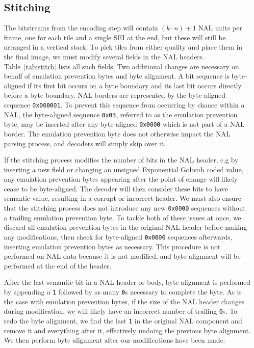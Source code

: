 \subsection{Stitching}

The bitstreams from the encoding step will contain $(k \cdot n)+1$ NAL units per frame, one for each tile and a single SEI at the end, but these will still be arranged in a vertical stack. To pick tiles from either quality and place them in the final image, we must modify several fields in the NAL headers. Table~\ref{tab:stitch} lists all such fields. Two additional changes are necessary on behalf of emulation prevention bytes and byte alignment. A bit sequence is byte-aligned if its first bit occurs on a byte boundary and its last bit occurs directly before a byte boundary. NAL borders are represented by the byte-aligned sequence \texttt{0x000001}. To prevent this sequence from occurring by chance within a NAL, the byte-aligned sequence \texttt{0x03}, referred to as the emulation prevention byte, may be inserted after any byte-aligned \texttt{0x0000} which is not part of a NAL border. The emulation prevention byte does not otherwise impact the NAL parsing process, and decoders will simply skip over it.

If the stitching process modifies the number of bits in the NAL header, e.g by inserting a new field or changing an unsigned Exponential Golomb coded value, any emulation prevention bytes appearing after the point of change will likely cease to be byte-aligned. The decoder will then consider these bits to have semantic value, resulting in a corrupt or incorrect header. We must also ensure that the stitching process does not introduce any new \texttt{0x0000} sequences without a trailing emulation prevention byte. To tackle both of these issues at once, we discard all emulation prevention bytes in the original NAL header before making any modifications, then check for byte-aligned \texttt{0x0000} sequences afterwards, inserting emulation prevention bytes as necessary. This procedure is not performed on NAL data because it is not modified, and byte alignment will be performed at the end of the header.

After the last semantic bit in a NAL header or body, byte alignment is performed by appending a \texttt{1} followed by as many \texttt{0}s necessary to complete the byte. As is the case with emulation prevention bytes, if the size of the NAL header changes during modification, we will likely have an incorrect number of trailing \texttt{0}s. To redo the byte alignment, we find the last \texttt{1} in the original NAL component and remove it and everything after it, effectively undoing the previous byte alignment. We then perform byte alignment after our modifications have been made.

